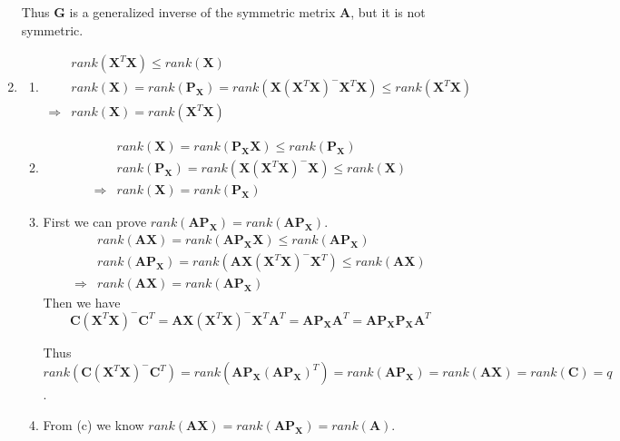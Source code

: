 \documentclass{article}
\begin{document}
\begin{enumerate}[leftmargin = 0 em, label = \arabic*., font = \bfseries]
	Thus $\bm G $ is a generalized inverse of the symmetric metrix $\bm A$, but it is not symmetric.

	\item 
	\begin{enumerate}
		\item 
		\begin{align*}
		& rank(\bm X^T \bm X) \leq rank(\bm X)\\
		& rank(\bm X) = rank(\bm P_{\bm X}) = rank(\bm X (\bm X^T \bm X)^- \bm X^T \bm X) \leq rank(\bm X^T \bm X)\\
		\Rightarrow & rank(\bm X) = rank(\bm X^T \bm X)
		\end{align*}


		\item 
		\begin{align*}
		& rank(\bm X) = rank(\bm P_{\bm X} \bm X) \leq rank(\bm P_{\bm X})\\
		& rank(\bm P_{\bm X}) = rank(\bm X (\bm X^T \bm X)^- \bm X) \leq rank(\bm X)\\
		\Rightarrow & rank(\bm X) = rank(\bm P_{\bm X})
		\end{align*}

		\item 
		First we can prove $rank(\bm A \bm P_{\bm X}) = rank(\bm A \bm P_{\bm X})$.
		\begin{align*}
		& rank(\bm A \bm X) = rank(\bm A \bm P_{\bm X} \bm X) \leq rank(\bm A \bm P_{\bm X})\\
		& rank(\bm A \bm P_{\bm X}) = rank(\bm A \bm X (\bm X^T \bm X)^- \bm X^T) \leq rank(\bm A \bm X)\\
		\Rightarrow & rank(\bm A \bm X) = rank(\bm A \bm P_{\bm X})
		\end{align*}
		Then we have 
		\[\bm C (\bm X^T \bm X)^- \bm C^T = \bm A \bm X (\bm X^T \bm X)^- \bm X^T \bm A^T = \bm A \bm P_{\bm X} \bm A^T = \bm A \bm P_{\bm X} \bm P_{\bm X} \bm A^T\]

		Thus $rank(\bm C(\bm X^T \bm X)^- \bm C^T) = rank(\bm A \bm P_{\bm X} (\bm A \bm P_{\bm X})^T) = rank(\bm A \bm P_{\bm X}) = rank(\bm A \bm X) = rank(\bm C) = q$.	

			\item 
			From (c) we know $rank(\bm A \bm X) = rank(\bm A \bm P_{\bm X}) = rank(\bm A)$.	
		
		
	\end{enumerate}
	


\end{enumerate}
\end{document}
